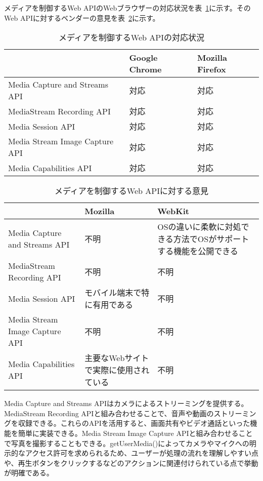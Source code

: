 メディアを制御するWeb APIのWebブラウザーの対応状況を表~\ref{table:メディアを制御するWeb APIの対応状況}に示す。そのWeb APIに対するベンダーの意見を表~\ref{table:メディアを制御するWeb APIに対する意見}に示す。
\begin{table}
  \caption{メディアを制御するWeb APIの対応状況}
  \label{table:メディアを制御するWeb APIの対応状況}
  \centering
  \begin{tabular}{|p{13em}|p{8em}|p{8em}|}
    \hline
    & Google Chrome & Mozilla Firefox \\ \hline
    Media Capture and Streams API & \cellcolor{green!25}対応 & \cellcolor{green!25}対応 \\ \hline
    MediaStream Recording API & \cellcolor{green!25}対応 & \cellcolor{green!25}対応 \\ \hline
    Media Session API & \cellcolor{green!25}対応 & \cellcolor{green!25}対応 \\ \hline
    Media Stream Image Capture API & \cellcolor{green!25}対応 & \cellcolor{green!25}対応 \\ \hline
    Media Capabilities API & \cellcolor{green!25}対応 & \cellcolor{green!25}対応 \\ \hline
  \end{tabular}
\end{table}
\begin{table}
  \caption{メディアを制御するWeb APIに対する意見}
  \label{table:メディアを制御するWeb APIに対する意見}
    \centering
    \begin{tabular}{|p{13em}|p{13em}|p{13em}|}
        \hline
        & Mozilla & WebKit \\ \hline
        Media Capture and Streams API & 不明 & \cellcolor{green!25}OSの違いに柔軟に対処できる方法でOSがサポートする機能を公開できる\cite{WebKitMediaCaptureandStreamsAPI} \\ \hline
        MediaStream Recording API & 不明 & 不明 \\ \hline
        Media Session API & \cellcolor{green!25}モバイル端末で特に有用である~\cite{MozillaMediaSessionAPI} & 不明 \\ \hline
        Media Stream Image Capture API & 不明 & 不明 \\ \hline
        Media Capabilities API & \cellcolor{green!25}主要なWebサイトで実際に使用されている\cite{MozillaMediaCapabilitiesAPI} & 不明 \\ \hline
    \end{tabular}
\end{table}
Media Capture and Streams APIはカメラによるストリーミングを提供する。MediaStream Recording APIと組み合わせることで、音声や動画のストリーミングを収録できる。これらのAPIを活用すると、画面共有やビデオ通話といった機能を簡単に実装できる。Media Stream Image Capture APIと組み合わせることで写真を撮影することもできる。getUserMedia()によってカメラやマイクへの明示的なアクセス許可を求められるため、ユーザーが処理の流れを理解しやすい点や、再生ボタンをクリックするなどのアクションに関連付けられている点で挙動が明確である。

